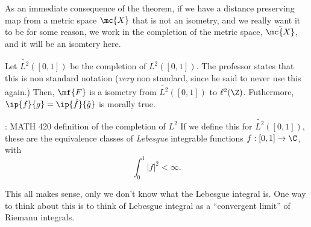 \begin{note}
    As an immediate consequence of the theorem, if we have a distance preserving map from a metric space \(\mc{X}\) that is not an isometry, and we really want it to be for some reason, we work in the completion of the metric space, \(\tilde{\mc{X}}\), and it will be an isomtery here.
\end{note}
\begin{note}
    Let \(\tilde{L^2}([0,1])\) be the completion of \(L^2([0,1])\). The professor states that this is non standard notation (\emph{very} non standard, since he said to never use this again.) Then, \(\mf{F}\) is a isometry from \(\tilde{L^2}([0,1])\) to \(\ell^2(\Z)\). Futhermore, \(\ip{f}{g}=\ip{\hat{f}}{\hat{g}}\) is morally true.
\end{note}

\begin{ndef}{: MATH 420 definition of the completion of \(L^2\)}
    If we define this for \(\tilde{L^2}([0,1])\), these are the equivalence classes of \emph{Lebesgue} integrable functions \(f:[0,1]\to\C\), with
    \begin{equation*} 
        \int_0^1 |f|^2<\infty.
    \end{equation*}
\end{ndef}
This all makes sense, only we don't know what the Lebesgue integral is. One way to think about this is to think of Lebesgue integral as a ``convergent limit'' of Riemann integrals.

